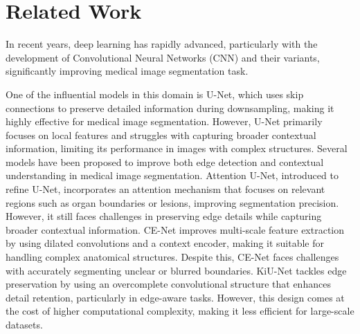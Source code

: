 \section{Related Work}
In recent years, deep learning has rapidly advanced, particularly with the development of Convolutional Neural Networks (CNN) and their variants, significantly improving medical image segmentation task\cite{ZHANG2023109020}. 

 One of the influential models in this domain is U-Net\cite{unet}, which uses skip connections to preserve detailed information during downsampling, making it highly effective for medical image segmentation. However, U-Net primarily focuses on local features and struggles with capturing broader contextual information, limiting its performance in images with complex structures. Several models have been proposed to improve both edge detection and contextual understanding in medical image segmentation. Attention U-Net\cite{atunet}, introduced to refine U-Net, incorporates an attention mechanism that focuses on relevant regions such as organ boundaries or lesions, improving segmentation precision. However, it still faces challenges in preserving edge details while capturing broader contextual information. CE-Net\cite{ce} improves multi-scale feature extraction by using dilated convolutions and a context encoder, making it suitable for handling complex anatomical structures. Despite this, CE-Net faces challenges with accurately segmenting unclear or blurred boundaries. KiU-Net\cite{DBLP:journals/tmi/ValanarasuSHP22} tackles edge preservation by using an overcomplete convolutional structure that enhances detail retention, particularly in edge-aware tasks. However, this design comes at the cost of higher computational complexity, making it less efficient for large-scale datasets.